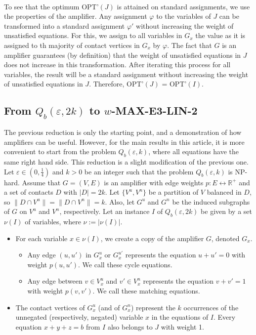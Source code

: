 \documentclass[12pt]{article}
\begin{document}
\\
To see that the optimum OPT'$(J)$ is attained on standard assignments, we use the properties of the amplifier.
Any assignment $\varphi$ to the variables of $J$ can be transformed into a standard assignment $\varphi'$ without increasing the weight of unsatisfied equations.
For this, we assign to all variables in $G_x$ the value as it is assigned to th majority of contact vertices in $G_x$ by $\varphi$. The fact that $G$ is an amplifier guarantees (by definition) that the weight of unsatisfied equations in $J$ does not increase in this transformation. 
After iterating this process for all variables, the result will be a standard assignment without increasing the weight of unsatisfied equations in $J$. 
Therefore, OPT'$(J)$ = OPT'$(I)$.

\subsection{From $Q_b(\varepsilon, 2k)$ to $w$-MAX-E3-LIN-2}
The previous reduction is only the starting point, and a demonstration of how amplifiers can be useful. 
However, for the main results in this article, it is more convenient to start from the problem $Q_b(\varepsilon, k)$, where all equations have the same right hand side.
This reduction is a slight modification of the previous one. 
Let $\varepsilon \in (0, \frac{1}{4})$ and $k>0$ be an integer such that the problem $Q_b(\varepsilon, k)$ is NP-hard. Assume that $G=(V,E)$ is an amplifier with edge weights $p:E\leftrightarrow \mathbb{R}^+$ and a set of contacts $D$ with $|D|=2k$.
Let $\{V^u,V^n\}$  be a partition of $V$ balanced in $D$, so $\|D\cap V^u\| = \|D \cap V^n\| = k$. Also, let $G^u$ and $G^n$ be the induced subgraphs of $G$ on $V^u$ and $V^n$, respectively.
Let an instance $I$ of $Q_b(\varepsilon, 2k)$ be given by a set $\nu(I)$ of variables, where $\nu:=|\nu(I)|$.
\begin{itemize}
\item For each variable $x \in \nu(I)$, we create a copy of the amplifier $G$, denoted $G_x$.
        \begin{itemize}
            \item Any edge $(u,u')$ in $G^u_x$ or $G^{u'}_x$ represents the equation $u + u' = 0$ with weight $p(u,u')$. We call these cycle equations.
            \item Any edge between $v\in V^u_x$ and $v'\in V^n_x$ represents the equation $v + v' = 1$ with weight $p(v,v')$. We call these matching equations.
        \end{itemize}
\item The contact vertices of $G_x^u$ (and of $G_x^n$) represent the $k$ occurrences of the unnegated (respectively, negated) variable $x$ in the equations of $I$. Every equation $x+y+z=b$ from $I$ also belongs to $J$ with weight 1.
\end{itemize}
\end{document}
